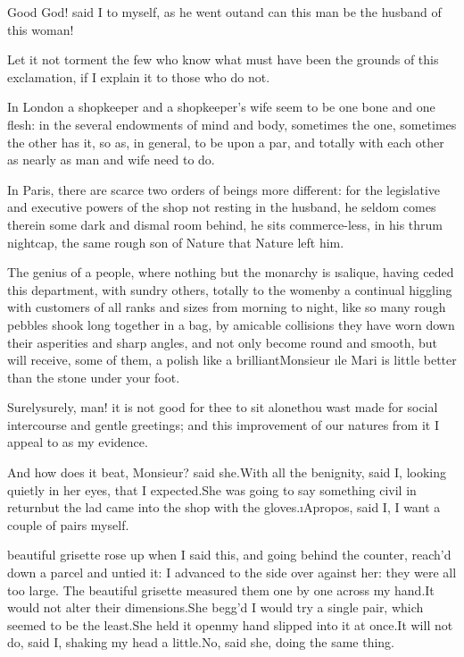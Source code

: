 \documentclass[twoside]{article}
\begin{document}
Good God! said I to myself, as he went out\tsk and can this man be the
husband of this woman!

Let it not torment the few who know what must have been the grounds of
this exclamation, if I explain it to those who do not.

In London a shopkeeper and a shopkeeper’s wife seem to be one bone and
one flesh: in the several endowments of mind and body, sometimes the one,
sometimes the other has it, so as, in general, to be upon a par, and
totally with each other as nearly as man and wife need to do.

In Paris, there are scarce two orders of beings more different: for the
legislative and executive powers of the shop not resting in the husband,
he seldom comes there\tsk in some dark and dismal room behind, he sits
commerce-less, in his thrum nightcap, the same rough son of Nature that
Nature left him.

The genius of a people, where nothing but the monarchy is \i{salique},
having ceded this department, with sundry others, totally to the
women\tsk by a continual higgling with customers of all ranks and sizes from
morning to night, like so many rough pebbles shook long together in a
bag, by amicable collisions they have worn down their asperities and
sharp angles, and not only become round and smooth, but will receive,
some of them, a polish like a brilliant\tsk Monsieur \i{le Mari} is little
better than the stone under your foot.

\tsk Surely\tsk surely, man! it is not good for thee to sit alone\tsk thou wast
made for social intercourse and gentle greetings; and this improvement of
our natures from it I appeal to as my evidence.

\tsk And how does it beat, Monsieur? said she.\tsk With all the benignity, said
I, looking quietly in her eyes, that I expected.\tsk She was going to say
something civil in return\tsk but the lad came into the shop with the
gloves.\tsk \i{Apropos}, said I, I want a couple of pairs myself.






 beautiful grisette rose up when I said this, and going behind the
counter, reach’d down a parcel and untied it: I advanced to the side over
against her: they were all too large.  The beautiful grisette measured
them one by one across my hand.\tsk It would not alter their dimensions.\tsk She
begg’d I would try a single pair, which seemed to be the least.\tsk She held
it open\tsk my hand slipped into it at once.\tsk It will not do, said I, shaking
my head a little.\tsk No, said she, doing the same thing.
\end{document}
